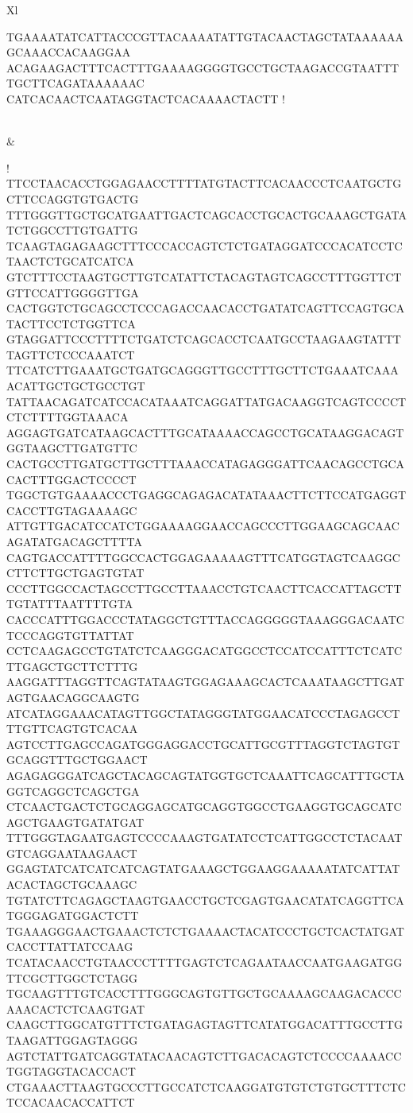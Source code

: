 \begin{xltabular}{\textwidth}{Xl}
\begin{minipage}{.85\textwidth}
				TGAAAATATCATTACCCGTTACAAAATATTGTACAACTAGCTATAAAAAAGCAAACCACAAGGAA
				ACAGAAGACTTTCACTTTGAAAAGGGGTGCCTGCTAAGACCGTAATTTTGCTTCAGATAAAAAAC
				CATCACAACTCAATAGGTACTCACAAAACTACTT
			!
			\vspace*{4pt}
		\end{minipage}
	\\
	 & 
		\begin{minipage}{.85\textwidth}
			\vspace*{4pt}
			\DNA!
				TTCCTAACACCTGGAGAACCTTTTATGTACTTCACAACCCTCAATGCTGCTTCCAGGTGTGACTG
				TTTGGGTTGCTGCATGAATTGACTCAGCACCTGCACTGCAAAGCTGATATCTGGCCTTGTGATTG
				TCAAGTAGAGAAGCTTTCCCACCAGTCTCTGATAGGATCCCACATCCTCTAACTCTGCATCATCA
				GTCTTTCCTAAGTGCTTGTCATATTCTACAGTAGTCAGCCTTTGGTTCTGTTCCATTGGGGTTGA
				CACTGGTCTGCAGCCTCCCAGACCAACACCTGATATCAGTTCCAGTGCATACTTCCTCTGGTTCA
				GTAGGATTCCCTTTTCTGATCTCAGCACCTCAATGCCTAAGAAGTATTTTAGTTCTCCCAAATCT
				TTCATCTTGAAATGCTGATGCAGGGTTGCCTTTGCTTCTGAAATCAAAACATTGCTGCTGCCTGT
				TATTAACAGATCATCCACATAAATCAGGATTATGACAAGGTCAGTCCCCTCTCTTTTGGTAAACA
				AGGAGTGATCATAAGCACTTTGCATAAAACCAGCCTGCATAAGGACAGTGGTAAGCTTGATGTTC
				CACTGCCTTGATGCTTGCTTTAAACCATAGAGGGATTCAACAGCCTGCACACTTTGGACTCCCCT
				TGGCTGTGAAAACCCTGAGGCAGAGACATATAAACTTCTTCCATGAGGTCACCTTGTAGAAAAGC
				ATTGTTGACATCCATCTGGAAAAGGAACCAGCCCTTGGAAGCAGCAACAGATATGACAGCTTTTA
				CAGTGACCATTTTGGCCACTGGAGAAAAAGTTTCATGGTAGTCAAGGCCTTCTTGCTGAGTGTAT
				CCCTTGGCCACTAGCCTTGCCTTAAACCTGTCAACTTCACCATTAGCTTTGTATTTAATTTTGTA
				CACCCATTTGGACCCTATAGGCTGTTTACCAGGGGGTAAAGGGACAATCTCCCAGGTGTTATTAT
				CCTCAAGAGCCTGTATCTCAAGGGACATGGCCTCCATCCATTTCTCATCTTGAGCTGCTTCTTTG
				AAGGATTTAGGTTCAGTATAAGTGGAGAAAGCACTCAAATAAGCTTGATAGTGAACAGGCAAGTG
				ATCATAGGAAACATAGTTGGCTATAGGGTATGGAACATCCCTAGAGCCTTTGTTCAGTGTCACAA
				AGTCCTTGAGCCAGATGGGAGGACCTGCATTGCGTTTAGGTCTAGTGTGCAGGTTTGCTGGAACT
				AGAGAGGGATCAGCTACAGCAGTATGGTGCTCAAATTCAGCATTTGCTAGGTCAGGCTCAGCTGA
				CTCAACTGACTCTGCAGGAGCATGCAGGTGGCCTGAAGGTGCAGCATCAGCTGAAGTGATATGAT
				TTTGGGTAGAATGAGTCCCCAAAGTGATATCCTCATTGGCCTCTACAATGTCAGGAATAAGAACT
				GGAGTATCATCATCATCAGTATGAAAGCTGGAAGGAAAAATATCATTATACACTAGCTGCAAAGC
				TGTATCTTCAGAGCTAAGTGAACCTGCTCGAGTGAACATATCAGGTTCATGGGAGATGGACTCTT
				TGAAAGGGAACTGAAACTCTCTGAAAACTACATCCCTGCTCACTATGATCACCTTATTATCCAAG
				TCATACAACCTGTAACCCTTTTGAGTCTCAGAATAACCAATGAAGATGGTTCGCTTGGCTCTAGG
				TGCAAGTTTGTCACCTTTGGGCAGTGTTGCTGCAAAAGCAAGACACCCAAACACTCTCAAGTGAT
				CAAGCTTGGCATGTTTCTGATAGAGTAGTTCATATGGACATTTGCCTTGTAAGATTGGAGTAGGG
				AGTCTATTGATCAGGTATACAACAGTCTTGACACAGTCTCCCCAAAACCTGGTAGGTACACCACT
				CTGAAACTTAAGTGCCCTTGCCATCTCAAGGATGTGTCTGTGCTTTCTCTCCACAACACCATTCT

\end{minipage}
\end{xltabular}
